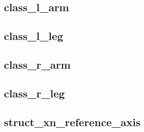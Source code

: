 \documentclass[letterpaper]{article}
\begin{document}


\subsection{class\_l\_arm}

\subsection{class\_l\_leg}

\subsection{class\_r\_arm}

\subsection{class\_r\_leg}

\subsection{struct\_xn\_reference\_axis}
	
	
\end{document}
